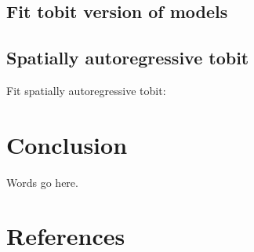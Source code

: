 \documentclass[10pt,letterpaper]{article}
\begin{document}
\hypertarget{fit-tobit-version-of-models}{%
\subsection{Fit tobit version of
models}\label{fit-tobit-version-of-models}}

\begin{table}

\caption{\label{tab:unnamed-chunk-3}\label{tab:tobit-results}Marginal effects of sample selection models}
\centering
{}
\end{table}

\hypertarget{spatially-autoregressive-tobit}{%
\subsection{Spatially autoregressive
tobit}\label{spatially-autoregressive-tobit}}

Fit spatially autoregressive tobit:

\hypertarget{conclusion}{%
\section{Conclusion}\label{conclusion}}

Words go here.

\hypertarget{references}{%
\section*{References}\label{references}}
\end{document}
